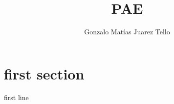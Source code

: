 \documentclass{article}
\title{PAE}
\author{Gonzalo Matías Juarez Tello}
\date{}
\begin{document}
\maketitle

\section{first section}
first line
\end{document}
